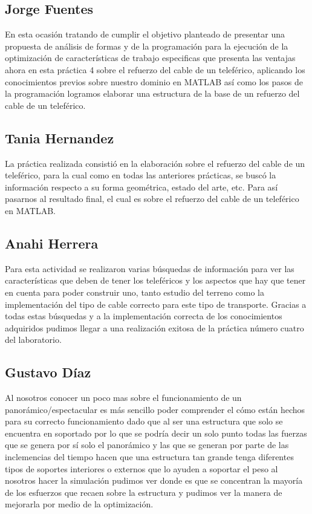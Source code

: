 \documentclass{article}
\begin{document}
\subsection{Jorge  Fuentes}
En esta ocasión tratando de cumplir el objetivo planteado de presentar una propuesta de análisis de formas y de la programación para la ejecución de la optimización de características de trabajo especificas que presenta las ventajas ahora en esta práctica 4 sobre el refuerzo del cable de un teleférico, aplicando los conocimientos previos sobre nuestro dominio en MATLAB así como los pasos de la programación logramos elaborar una estructura de la base de un refuerzo del cable de un teleférico.
\subsection{Tania  Hernandez}
La práctica realizada consistió en la elaboración sobre el refuerzo del cable de un teleférico, para la cual como en todas las anteriores prácticas, se buscó la información respecto a su forma geométrica, estado del arte, etc. Para así pasarnos al resultado final, el cual es sobre el refuerzo del cable de un teleférico en MATLAB.
\subsection{Anahi Herrera}
Para esta actividad se realizaron varias búsquedas de información para ver las características que deben de tener los teleféricos y los aspectos que hay que tener en cuenta para poder construir uno, tanto estudio del terreno como la implementación del tipo de cable correcto para este tipo de transporte. Gracias a todas estas búsquedas y a la implementación correcta de los conocimientos adquiridos pudimos llegar a una realización exitosa de la práctica número cuatro del laboratorio. 
\subsection{Gustavo  Díaz}
Al nosotros conocer un poco mas sobre el funcionamiento de un panorámico/espectacular es más sencillo poder comprender el cómo están hechos para su correcto funcionamiento dado que al ser una estructura que solo se encuentra en soportado por lo que se podría decir un solo punto todas las fuerzas que se genera por sí solo el panorámico y las que se generan por parte de las inclemencias del tiempo hacen que una estructura tan grande tenga diferentes tipos de soportes interiores o externos que lo ayuden a soportar el peso al nosotros hacer la simulación pudimos ver donde es que se concentran la mayoría de los esfuerzos que recaen sobre la estructura y pudimos ver la manera de mejorarla por medio de la optimización.
\end{document}
